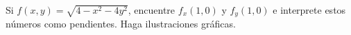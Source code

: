 \item Si $f(x, y) = \sqrt{4 - x^2 - 4y^2}$, encuentre $f_x(1, 0)$ y $f_y(1, 0)$ e interprete estos números como pendientes. Haga ilustraciones gráficas.
